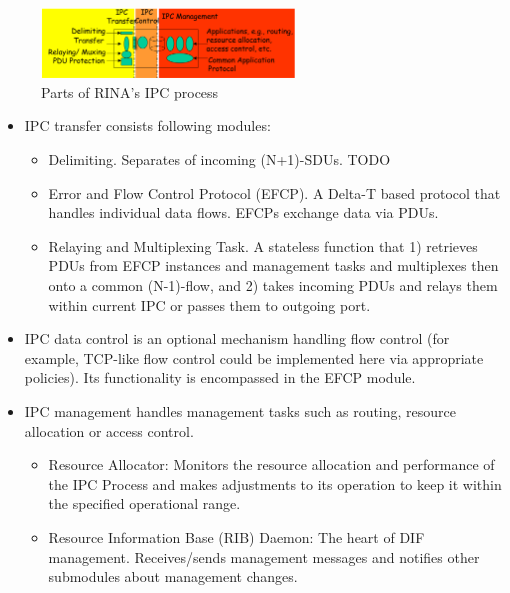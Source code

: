                 \begin{figure}[H]
                    \begin{center}
                        \includegraphics[width=0.6\textwidth]{fig/archs_rina-ipcp.png}
                      \caption{Parts of RINA's IPC process}
                      \label{fig:rina_ipcp}
                    \end{center}
                \end{figure}

                \begin{itemize}
                    \item IPC transfer consists following modules:
                    \begin{itemize}
                        \item Delimiting. Separates of incoming (N+1)-SDUs. TODO
                        \item Error and Flow Control Protocol (EFCP). A Delta-T \cite{deltat} based protocol that handles individual data flows. EFCPs exchange data via PDUs.
                        \item Relaying and Multiplexing Task. A stateless function that 1) retrieves PDUs from EFCP instances and management tasks and multiplexes then onto a common (N-1)-flow, and 2) takes incoming PDUs and relays them within current IPC or passes them to outgoing port.
                    \end{itemize}
                    \item IPC data control is an optional mechanism handling flow control (for example, TCP-like flow control could be implemented here via appropriate policies). Its functionality is encompassed in the EFCP module.
                    \item IPC management handles management tasks such as routing, resource allocation or access control.
                    \begin{itemize}
                        \item Resource Allocator: Monitors the resource allocation and performance of the IPC Process and makes adjustments to its operation to keep it within the specified operational range.
                        \item Resource Information Base (RIB) Daemon: The heart of DIF management. Receives/sends management messages and notifies other submodules about management changes.
                    \end{itemize}
                \end{itemize}


